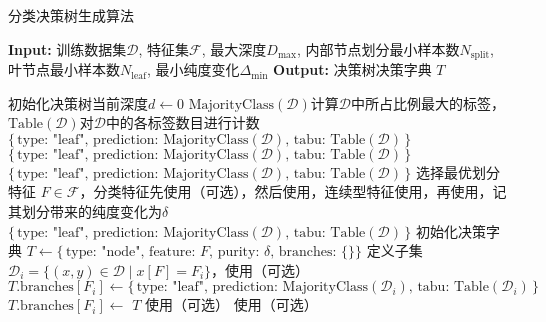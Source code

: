 \begin{algorithm}
	\caption{分类决策树生成算法}
	\begin{algorithmic}[1]
		\State \textbf{Input:}
		 训练数据集\(\mathcal{D}\), 
		 特征集\(\mathcal{F}\), 
		 最大深度\(D_{\max}\), 
		 内部节点划分最小样本数\(N_{\text{split}}\), 
		 叶节点最小样本数\(N_{\text{leaf}}\), 
		 最小纯度变化\(\Delta_{\min}\)
		\State \textbf{Output:} 决策树决策字典 \(T\)
		
		\State 初始化决策树当前深度\(d\gets 0\)
		\State$\text{MajorityClass$(\mathcal{D})$}$计算$\mathcal{D}$中所占比例最大的标签，$\text{Table}(\mathcal{D})$对$\mathcal{D}$中的各标签数目进行计数
		\State \Return \(\{\,\text{type: "leaf", prediction: MajorityClass$(\mathcal{D})$, tabu: Table$(\mathcal{D})$}\,\}\)
		\EndIf
		\State \Return \(\{\,\text{type: "leaf", prediction: MajorityClass$(\mathcal{D})$, tabu: Table$(\mathcal{D})$}\,\}\)
		\EndIf
		\State \Return \(\{\,\text{type: "leaf", prediction: MajorityClass$(\mathcal{D})$, tabu: Table$(\mathcal{D})$}\,\}\)
		\EndIf
		\State 选择最优划分特征 \(F \in \mathcal{F}\)，分类特征先使用（可选），然后使用，连续型特征使用，再使用，记其划分带来的纯度变化为$\delta$
		\If{$\delta$ \(< \Delta_{\min}\)}
		\State \Return \(\{\,\text{type: "leaf", prediction: MajorityClass$(\mathcal{D})$, tabu: Table$(\mathcal{D})$}\,\}\)
		\EndIf
		\State 初始化决策字典 \(T \gets \{\,\text{type: "node", feature: } F,\, \text{purity: }\delta,\, \text{branches: \{\}}\}\)
		\State 定义子集 \(\mathcal{D}_i = \{(x,y) \in \mathcal{D} \mid x[F] = F_i\}\)，使用（可选）
		\State \(T.\text{branches}[F_i] \gets \{\,\text{type: "leaf", prediction: MajorityClass$(\mathcal{D}_i)$, tabu: Table$(\mathcal{D}_i)$}\,\}\)
		\Else
		\State \(T.\text{branches}[F_i] \gets\) 
		\EndIf
		\EndFor
		\State \Return \(T\)
		\EndFunction
		\State 使用（可选）
		\State 使用（可选）
	\end{algorithmic}
\end{algorithm}

